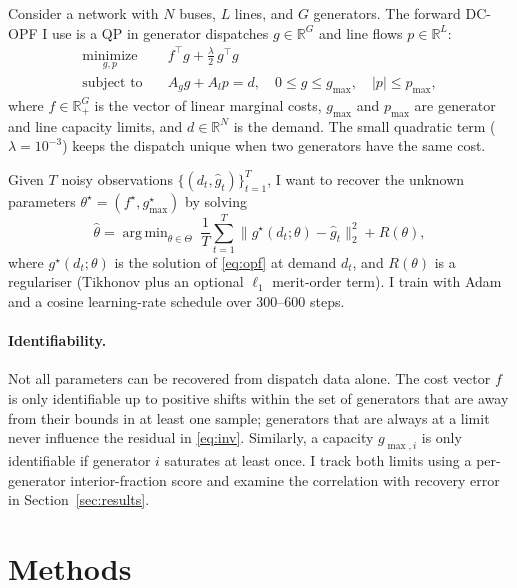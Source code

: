 \documentclass[10pt,letterpaper]{article}
\newcommand{\Cref}[1]{Section~\ref{#1}}
\DeclareMathOperator*{\argmin}{arg\,min}
\newcommand{\R}{\mathbb{R}}
\newcommand{\opt}{^{\star}}
\begin{document}
Consider a network with $N$ buses, $L$ lines, and $G$ generators.
The forward DC-OPF I use is a QP in generator dispatches $g \in \R^G$
and line flows $p \in \R^L$:
\begin{equation}\label{eq:opf}
\begin{aligned}
\underset{g,p}{\text{minimize}}\quad
& f^{\!\top} g + \tfrac{\lambda}{2}\, g^{\!\top} g\\
\text{subject to}\quad
& A_g g + A_l p = d,\quad 0 \le g \le g_{\max},\quad |p| \le p_{\max},
\end{aligned}
\end{equation}
where $f \in \R^{G}_{+}$ is the vector of linear marginal costs,
$g_{\max}$ and $p_{\max}$ are generator and line capacity limits, and
$d \in \R^N$ is the demand. The small quadratic term
($\lambda = 10^{-3}$) keeps the dispatch unique when two generators
have the same cost.

Given $T$ noisy observations $\{(d_t, \hat g_t)\}_{t=1}^{T}$,
I want to recover the unknown parameters
$\theta\opt = (f\opt, g\opt_{\max})$ by solving
\begin{equation}\label{eq:inv}
\hat\theta = \argmin_{\theta \in \Theta}\;
\frac{1}{T}\sum_{t=1}^{T}
\bigl\| g\opt(d_t; \theta) - \hat g_t \bigr\|_2^{2}
+ R(\theta),
\end{equation}
where $g\opt(d_t; \theta)$ is the solution of \eqref{eq:opf} at demand
$d_t$, and $R(\theta)$ is a regulariser (Tikhonov plus an optional
$\ell_1$ merit-order term). I train with Adam and a cosine
learning-rate schedule over $300$--$600$ steps.

\paragraph{Identifiability.}
Not all parameters can be recovered from dispatch data alone.
The cost vector $f$ is only identifiable up to positive shifts within
the set of generators that are away from their bounds in at least one
sample; generators that are always at a limit never influence the
residual in \eqref{eq:inv}. Similarly, a capacity $g_{\max,i}$ is
only identifiable if generator $i$ saturates at least once.
I track both limits using a per-generator interior-fraction score
and examine the correlation with recovery error in \Cref{sec:results}.

\section{Methods}\label{sec:methods}
\end{document}
